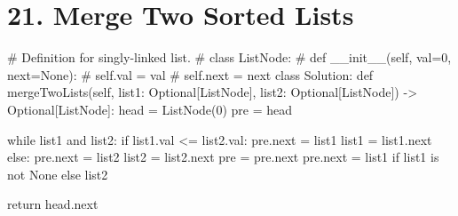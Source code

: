 \documentclass{article}
\begin{document}
\section{21. Merge Two Sorted Lists}

# Definition for singly-linked list.
# class ListNode:
#     def __init__(self, val=0, next=None):
#         self.val = val
#         self.next = next
class Solution:
    def mergeTwoLists(self, list1: Optional[ListNode], list2: Optional[ListNode]) -> Optional[ListNode]:
        head = ListNode(0)
        pre = head
        
        while list1 and list2:
            if list1.val <= list2.val:
                pre.next = list1
                list1 = list1.next
            else:
                pre.next = list2
                list2 = list2.next
            pre = pre.next
        pre.next = list1 if list1 is not None else list2
    
        return head.next

%
%
\end{document}
